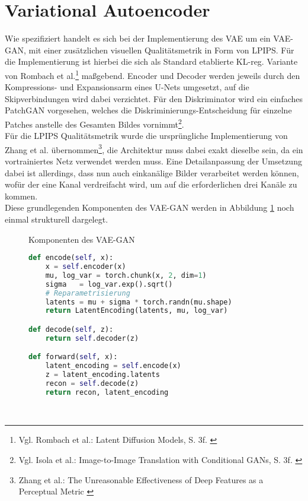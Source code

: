 \section {Variational Autoencoder}

Wie spezifiziert handelt es sich bei der Implementierung des \ac{VAE} um ein VAE-GAN, mit einer zusätzlichen visuellen Qualitätsmetrik in Form von \ac{LPIPS}. Für die Implementierung ist hierbei die sich als Standard etablierte KL-reg. Variante von Rombach et al.\footnote{
    Vgl. Rombach et al.: Latent Diffusion Models, S. 3f.
    \cite{rombach2022high}
} maßgebend. Encoder und Decoder werden jeweils durch den Kompressions- und Expansionsarm eines U-Nets umgesetzt, auf die Skipverbindungen wird dabei verzichtet. Für den Diskriminator wird ein einfaches PatchGAN vorgesehen, welches die Diskriminierungs-Entscheidung für einzelne Patches anstelle des Gesamten Bildes vornimmt\footnote{
    Vgl. Isola et al.: Image-to-Image Translation with Conditional GANs, S. 3f.
    \cite{isola2018imagetoimagetranslationconditionaladversarial}
}. \\
Für die \ac{LPIPS} Qualitätsmetrik wurde die ursprüngliche Implementierung von Zhang et al. übernommen\footnote{
    Zhang et al.: The Unreasonable Effectiveness of Deep Features as a Perceptual Metric
    \cite{zhang2018unreasonableeffectivenessdeepfeatures}
}, die Architektur muss dabei exakt dieselbe sein, da ein vortrainiertes Netz verwendet werden muss. Eine Detailanpassung der Umsetzung dabei ist allerdings, dass nun auch einkanälige Bilder verarbeitet werden können, wofür der eine Kanal verdreifacht wird, um auf die erforderlichen drei Kanäle zu kommen. \\
Diese grundlegenden Komponenten des VAE-GAN werden in Abbildung \ref{fig:vae_arch} noch einmal strukturell dargelegt. 
\begin{figure}[htbp]
    \centering
    \caption{Komponenten des VAE-GAN}
    \label{fig:vae_arch}
\end{figure}
\begin{figure}[htbp]
\begin{lstlisting}[language=python]
def encode(self, x):
    x = self.encoder(x)
    mu, log_var = torch.chunk(x, 2, dim=1) 
    sigma   = log_var.exp().sqrt()
    # Reparametrisierung
    latents = mu + sigma * torch.randn(mu.shape)
    return LatentEncoding(latents, mu, log_var)

def decode(self, z):
    return self.decoder(z)

def forward(self, x):
    latent_encoding = self.encode(x) 
    z = latent_encoding.latents
    recon = self.decode(z)
    return recon, latent_encoding
\end{lstlisting}
    \captionsetup{type=figure}
    \label{fig:vae_forward}
\end{figure} \\
